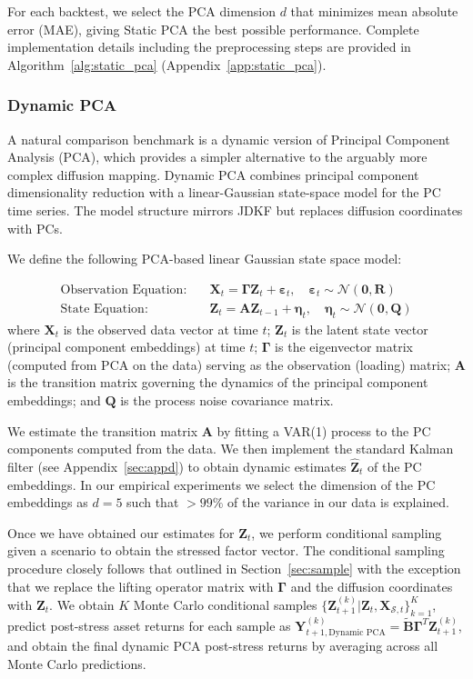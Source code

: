 \documentclass[11pt]{article}
\theoremstyle{plain}
\theoremstyle{definition}
\theoremstyle{remark}
\numberwithin{equation}{section}
\begin{document}
For each backtest, we select the PCA dimension $d$ that minimizes mean absolute error (MAE), giving Static PCA the best possible performance. Complete implementation details including the preprocessing steps are provided in Algorithm~\ref{alg:static_pca} (Appendix~\ref{app:static_pca}).


\subsubsection{Dynamic PCA}

A natural comparison benchmark is a dynamic version of Principal Component Analysis (PCA), which provides a simpler alternative to the arguably more complex diffusion mapping. Dynamic PCA combines principal component dimensionality reduction with a linear-Gaussian
state-space model for the PC time series. The model structure mirrors JDKF but replaces diffusion
coordinates with PCs.

We define the following PCA-based linear Gaussian state space model:

\begin{align}
\text{Observation Equation:} \quad & \mathbf{X}_t = \boldsymbol{\Gamma} \mathbf{Z}_t + \boldsymbol{\varepsilon}_t, \quad \boldsymbol{\varepsilon}_t \sim \mathcal{N}(\mathbf{0}, \mathbf{R}) \\
\text{State Equation:} \quad & \mathbf{Z}_t = \mathbf{A}\mathbf{Z}_{t-1} + \boldsymbol{\eta}_t, \quad \boldsymbol{\eta}_t \sim \mathcal{N}(\mathbf{0}, \mathbf{Q})
\end{align}
where $\mathbf{X}_t$ is the observed data vector at time $t$; $\mathbf{Z}_t$ is the latent state vector (principal component embeddings) at time $t$; $\boldsymbol{\Gamma}$ is the eigenvector matrix (computed from PCA on the data) serving as the observation (loading) matrix; $\mathbf{A}$ is the transition matrix governing the dynamics of the principal component embeddings; and $\mathbf{Q}$ is the process noise covariance matrix.

We estimate the transition matrix $\mathbf{A}$ by fitting a VAR(1) process to the PC components computed from the data. We then implement the standard Kalman filter (see Appendix~\ref{sec:appd}) to obtain dynamic estimates $\hat{\mathbf{Z}}_t$ of the PC embeddings. In our empirical experiments we select the dimension of the PC embeddings as $d = 5$ such that $>99\%$ of the variance in our data is explained.

Once we have obtained our estimates for $\mathbf{Z}_t$, we perform conditional sampling given a scenario to obtain the stressed factor vector. The conditional sampling procedure closely follows that outlined in Section~\ref{sec:sample} with the exception that we replace the lifting operator matrix with $\boldsymbol{\Gamma}$ and the diffusion coordinates with $\mathbf{Z}_t$. We obtain $K$ Monte Carlo conditional samples $\{\mathbf{Z}^{(k)}_{t+1} | \mathbf{Z}_t, \mathbf{X}_{\mathcal{S},t}\}_{k=1}^K$, predict post-stress asset returns for each sample as $\mathbf{Y}^{(k)}_{t+1,\text{Dynamic PCA}} = \tilde{\mathbf{B}}\boldsymbol{\Gamma}^T \mathbf{Z}^{(k)}_{t+1}$, and obtain the final dynamic PCA post-stress returns by averaging across all Monte Carlo predictions.
\end{document}
